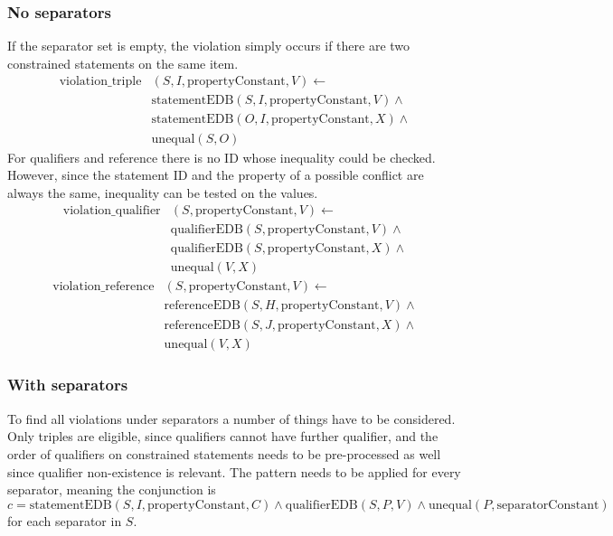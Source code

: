 \documentclass[hyperref,bachelorofscience,fleqn]{cgvpub}
\begin{document}
\subsubsection{No separators}
If the separator set is empty, the violation simply occurs if there are two constrained statements on the same item. 
\begin{equation}\label{eq_no_separators_triple}
\begin{split}
\text{violation\_triple}&(S, I, \text{propertyConstant}, V) \leftarrow \\
&\text{statementEDB}(S, I, \text{propertyConstant}, V) \wedge{} \\
&\text{statementEDB}(O, I, \text{propertyConstant}, X) \wedge{} \\
&\text{unequal}(S, O)
\end{split}
\end{equation}
For qualifiers and reference there is no ID whose inequality could be checked. However, since the statement ID and the property of a possible conflict are always the same, inequality can be tested on the values.
\begin{equation*}
\begin{split}
\text{violation\_qualifier}&(S, \text{propertyConstant}, V) \leftarrow \\
&\text{qualifierEDB}(S, \text{propertyConstant}, V) \wedge{} \\
&\text{qualifierEDB}(S, \text{propertyConstant}, X) \wedge{} \\
&\text{unequal}(V, X)
\end{split}
\end{equation*}
\begin{equation*}
\begin{split}
\text{violation\_reference}&(S, \text{propertyConstant}, V) \leftarrow \\
&\text{referenceEDB}(S, H, \text{propertyConstant}, V) \wedge{} \\
&\text{referenceEDB}(S, J, \text{propertyConstant}, X) \wedge{} \\
&\text{unequal}(V, X)
\end{split}
\end{equation*}

\subsubsection{With separators}\label{subsubsec_with_separators}
To find all violations under separators a number of things have to be considered. Only triples are eligible, since qualifiers cannot have further qualifier, and the order of qualifiers on constrained statements needs to be pre-processed as well since qualifier non-existence is relevant. The pattern needs to be applied for every separator, meaning the conjunction is
\begin{equation*}
c = \text{statementEDB}(S, I, \text{propertyConstant}, C) \wedge \text{qualifierEDB}(S, P, V) \wedge \text{unequal}(P, \text{separatorConstant})
\end{equation*}
for each separator in \(S\).\\
\end{document}
